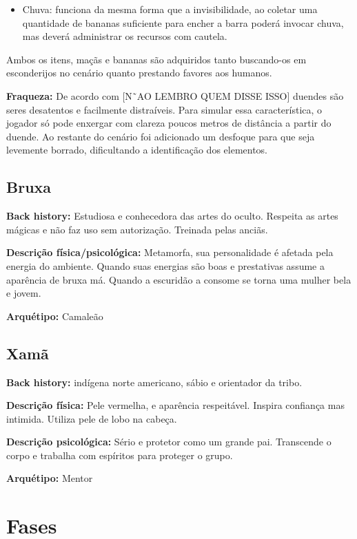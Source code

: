 \begin{itemize}
\item Chuva:  funciona da mesma forma que a invisibilidade, ao coletar uma quantidade de bananas suficiente para encher a barra poderá invocar chuva, mas deverá administrar os recursos com cautela.
\end{itemize}
Ambos os itens, maçãs e bananas são adquiridos tanto buscando-os em esconderijos no cenário quanto prestando favores aos humanos.

\textbf{Fraqueza:} De acordo com [N˜AO LEMBRO QUEM DISSE ISSO] duendes são seres desatentos e facilmente distraíveis. Para simular essa característica, o jogador só pode enxergar com clareza poucos metros de distância a partir do duende. Ao restante do cenário foi adicionado um desfoque para que seja levemente borrado, dificultando a identificação dos elementos.

\subsection{Bruxa}




\textbf{Back history:} Estudiosa e conhecedora das artes do oculto. Respeita as artes mágicas e não faz uso sem autorização. Treinada pelas anciãs.

\textbf{Descrição física/psicológica:} Metamorfa, sua personalidade é afetada pela energia do ambiente. Quando suas energias são boas e prestativas assume a aparência de bruxa má. Quando a escuridão a consome se torna uma mulher bela e jovem.

\textbf{Arquétipo: }Camaleão

\subsection{Xamã}

\textbf{Back history: }indígena norte americano, sábio e orientador da tribo.

\textbf{Descrição física: }Pele vermelha, e aparência respeitável. Inspira confiança mas intimida. Utiliza pele de lobo na cabeça.

\textbf{Descrição psicológica:} Sério e protetor como um grande pai. Transcende o corpo e trabalha com espíritos para proteger o grupo.

\textbf{Arquétipo:} Mentor

\section{Fases}

